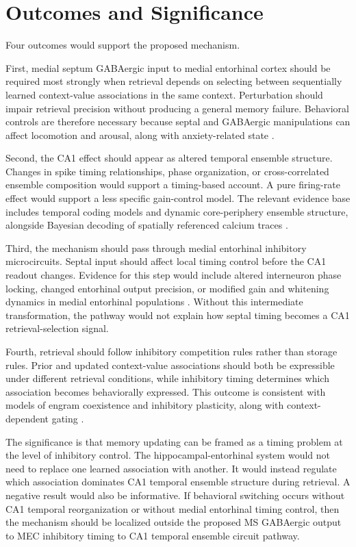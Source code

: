 \section{Outcomes and Significance}

Four outcomes would support the proposed mechanism.

First, medial septum GABAergic input to medial entorhinal cortex should be required most strongly when retrieval depends on selecting between sequentially learned context-value associations in the same context. Perturbation should impair retrieval precision without producing a general memory failure. Behavioral controls are therefore necessary because septal and GABAergic manipulations can affect locomotion and arousal, along with anxiety-related state \cite{arxiv181200625,arxiv221113591}.

Second, the CA1 effect should appear as altered temporal ensemble structure. Changes in spike timing relationships, phase organization, or cross-correlated ensemble composition would support a timing-based account. A pure firing-rate effect would support a less specific gain-control model. The relevant evidence base includes temporal coding models and dynamic core-periphery ensemble structure, alongside Bayesian decoding of spatially referenced calcium traces \cite{arxiv200106371,arxiv191211126,arxiv250809576}.

Third, the mechanism should pass through medial entorhinal inhibitory microcircuits. Septal input should affect local timing control before the CA1 readout changes. Evidence for this step would include altered interneuron phase locking, changed entorhinal output precision, or modified gain and whitening dynamics in medial entorhinal populations \cite{arxiv171204602,arxiv220910634,arxiv230111955}. Without this intermediate transformation, the pathway would not explain how septal timing becomes a CA1 retrieval-selection signal.

Fourth, retrieval should follow inhibitory competition rules rather than storage rules. Prior and updated context-value associations should both be expressible under different retrieval conditions, while inhibitory timing determines which association becomes behaviorally expressed. This outcome is consistent with models of engram coexistence and inhibitory plasticity, along with context-dependent gating \cite{arxiv250601659,arxiv181211581,arxiv231019614}.

The significance is that memory updating can be framed as a timing problem at the level of inhibitory control. The hippocampal-entorhinal system would not need to replace one learned association with another. It would instead regulate which association dominates CA1 temporal ensemble structure during retrieval. A negative result would also be informative. If behavioral switching occurs without CA1 temporal reorganization or without medial entorhinal timing control, then the mechanism should be localized outside the proposed MS GABAergic output to MEC inhibitory timing to CA1 temporal ensemble circuit pathway.

